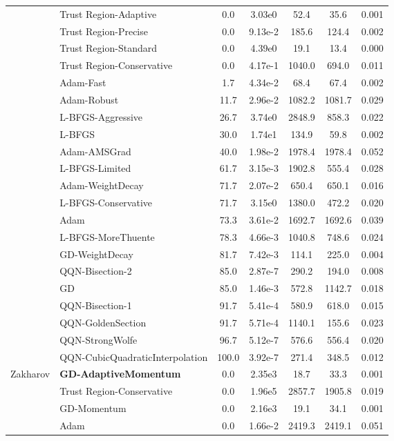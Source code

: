\documentclass{article}
\begin{document}
\begin{table}[htbp]
{\begin{tabular}{p{2.5cm}p{2.5cm}*{5}{c}}
 & Trust Region-Adaptive & 0.0 & 3.03e0 & 52.4 & 35.6 & 0.001 \\
 & Trust Region-Precise & 0.0 & 9.13e-2 & 185.6 & 124.4 & 0.002 \\
 & Trust Region-Standard & 0.0 & 4.39e0 & 19.1 & 13.4 & 0.000 \\
 & Trust Region-Conservative & 0.0 & 4.17e-1 & 1040.0 & 694.0 & 0.011 \\
 & Adam-Fast & 1.7 & 4.34e-2 & 68.4 & 67.4 & 0.002 \\
 & Adam-Robust & 11.7 & 2.96e-2 & 1082.2 & 1081.7 & 0.029 \\
 & L-BFGS-Aggressive & 26.7 & 3.74e0 & 2848.9 & 858.3 & 0.022 \\
 & L-BFGS & 30.0 & 1.74e1 & 134.9 & 59.8 & 0.002 \\
 & Adam-AMSGrad & 40.0 & 1.98e-2 & 1978.4 & 1978.4 & 0.052 \\
 & L-BFGS-Limited & 61.7 & 3.15e-3 & 1902.8 & 555.4 & 0.028 \\
 & Adam-WeightDecay & 71.7 & 2.07e-2 & 650.4 & 650.1 & 0.016 \\
 & L-BFGS-Conservative & 71.7 & 3.15e0 & 1380.0 & 472.2 & 0.020 \\
 & Adam & 73.3 & 3.61e-2 & 1692.7 & 1692.6 & 0.039 \\
 & L-BFGS-MoreThuente & 78.3 & 4.66e-3 & 1040.8 & 748.6 & 0.024 \\
 & GD-WeightDecay & 81.7 & 7.42e-3 & 114.1 & 225.0 & 0.004 \\
 & QQN-Bisection-2 & 85.0 & 2.87e-7 & 290.2 & 194.0 & 0.008 \\
 & GD & 85.0 & 1.46e-3 & 572.8 & 1142.7 & 0.018 \\
 & QQN-Bisection-1 & 91.7 & 5.41e-4 & 580.9 & 618.0 & 0.015 \\
 & QQN-GoldenSection & 91.7 & 5.71e-4 & 1140.1 & 155.6 & 0.023 \\
 & QQN-StrongWolfe & 96.7 & 5.12e-7 & 576.6 & 556.4 & 0.020 \\
 & QQN-CubicQuadraticInterpolation & 100.0 & 3.92e-7 & 271.4 & 348.5 & 0.012 \\
\midrule
\multirow{25}{*}{Zakharov} & \textbf{GD-AdaptiveMomentum} & 0.0 & 2.35e3 & 18.7 & 33.3 & 0.001 \\
 & Trust Region-Conservative & 0.0 & 1.96e5 & 2857.7 & 1905.8 & 0.019 \\
 & GD-Momentum & 0.0 & 2.16e3 & 19.1 & 34.1 & 0.001 \\
 & Adam & 0.0 & 1.66e-2 & 2419.3 & 2419.1 & 0.051 \\

\end{tabular}}
\end{table}
\end{document}
